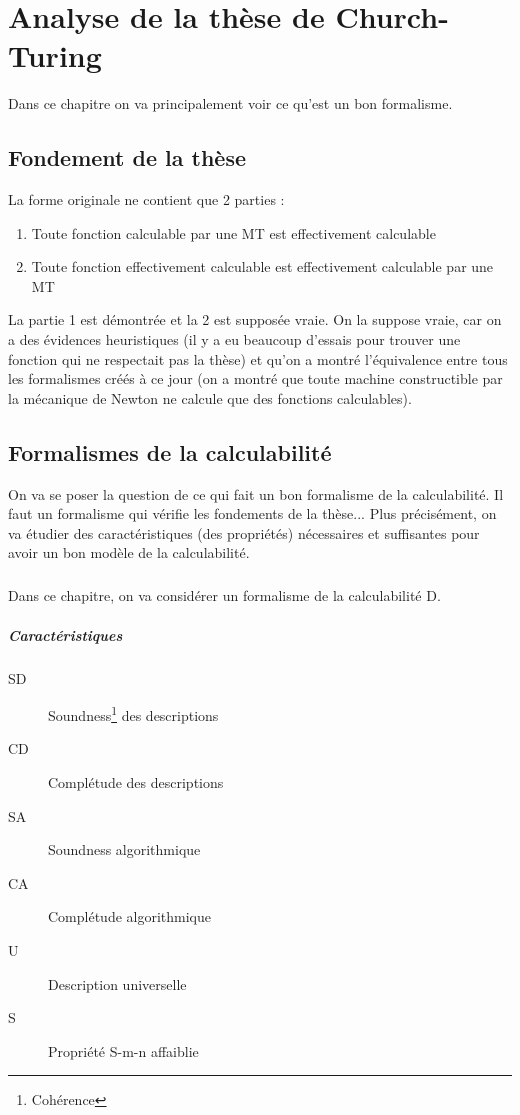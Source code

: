 
\chapter{Analyse de la thèse de Church-Turing}
\label{sec:analyse_de_la_th_se_de_church_turing}
Dans ce chapitre on va principalement voir ce qu'est un bon formalisme.

\section{Fondement de la thèse}
\label{sub:fondement_de_la_th_se}
La forme originale ne contient que 2 parties :
\begin{enumerate}
	\item Toute fonction calculable par une MT est effectivement calculable
	\item Toute fonction effectivement calculable est effectivement
		calculable par une MT
\end{enumerate}
La partie 1 est démontrée et la 2 est supposée vraie.
On la suppose vraie, car on a des évidences heuristiques (il y a eu beaucoup
d'essais pour trouver une fonction qui ne respectait pas la thèse) et qu'on a montré
l'équivalence entre tous les formalismes créés à ce jour (on a montré que toute
machine constructible par la mécanique de Newton ne calcule que des fonctions
calculables).

\section{Formalismes de la calculabilité}
\label{sub:formalismes_de_la_calculabilit_}
On va se poser la question de ce qui fait un bon formalisme de la
calculabilité. Il faut un formalisme qui vérifie les fondements de la
thèse... Plus précisément, on va étudier des caractéristiques (des propriétés)
nécessaires et suffisantes pour avoir un bon modèle de la calculabilité.

\paragraph{} Dans ce chapitre, on va considérer un formalisme de la
calculabilité D.

\paragraph{Caractéristiques}
\begin{description}
	\item[SD] Soundness\footnote{Cohérence} des descriptions
	\item[CD] Complétude des descriptions
	\item[SA] Soundness algorithmique
	\item[CA] Complétude algorithmique
	\item[U] Description universelle
	\item[S] Propriété S-m-n affaiblie
\end{description}


